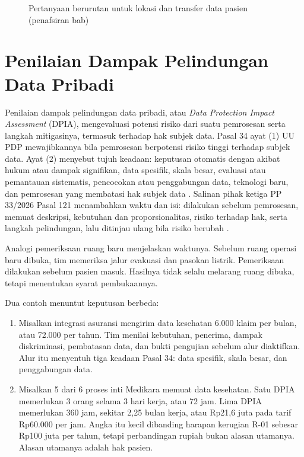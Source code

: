 \begin{figure}[!htb]
  \centering
  
  \caption{Pertanyaan berurutan untuk lokasi dan transfer data pasien (penafsiran bab)}
  \label{fig:ch07-transfer}
\end{figure}

\section{Penilaian Dampak Pelindungan Data Pribadi}

Penilaian dampak pelindungan data pribadi, atau \textit{Data Protection Impact Assessment} (DPIA),
mengevaluasi potensi risiko dari suatu pemrosesan serta langkah mitigasinya, termasuk terhadap hak
subjek data. Pasal 34 ayat (1) UU PDP mewajibkannya bila pemrosesan berpotensi risiko tinggi
terhadap subjek data. Ayat (2) menyebut tujuh keadaan: keputusan otomatis dengan akibat hukum atau
dampak signifikan, data spesifik, skala besar, evaluasi atau pemantauan sistematis, pencocokan atau
penggabungan data, teknologi baru, dan pemrosesan yang membatasi hak subjek data
\cite{uu27-2022-pdp}. Salinan pihak ketiga PP 33/2026 Pasal 121 menambahkan waktu dan isi: dilakukan
sebelum pemrosesan, memuat deskripsi, kebutuhan dan proporsionalitas, risiko terhadap hak, serta
langkah pelindungan, lalu ditinjau ulang bila risiko berubah \cite{c03-pp33-nonresmi}.

Analogi pemeriksaan ruang baru menjelaskan waktunya. Sebelum ruang operasi baru dibuka, tim
memeriksa jalur evakuasi dan pasokan listrik. Pemeriksaan dilakukan sebelum pasien masuk. Hasilnya
tidak selalu melarang ruang dibuka, tetapi menentukan syarat pembukaannya.

Dua contoh menuntut keputusan berbeda:
\begin{enumerate}
  \item Misalkan integrasi asuransi mengirim data kesehatan 6.000 klaim per bulan, atau 72.000 per
  tahun. Tim menilai kebutuhan, penerima, dampak diskriminasi, pembatasan data, dan bukti pengujian
  sebelum alur diaktifkan. Alur itu menyentuh tiga keadaan Pasal 34: data spesifik, skala besar, dan
  penggabungan data.
  \item Misalkan 5 dari 6 proses inti Medikara memuat data kesehatan. Satu DPIA memerlukan 3 orang
  selama 3 hari kerja, atau 72 jam. Lima DPIA memerlukan 360 jam, sekitar 2,25 bulan kerja, atau
  Rp21,6 juta pada tarif Rp60.000 per jam. Angka itu kecil dibanding harapan kerugian R-01 sebesar
  Rp100 juta per tahun, tetapi perbandingan rupiah bukan alasan utamanya. Alasan utamanya adalah
  hak pasien.
\end{enumerate}

